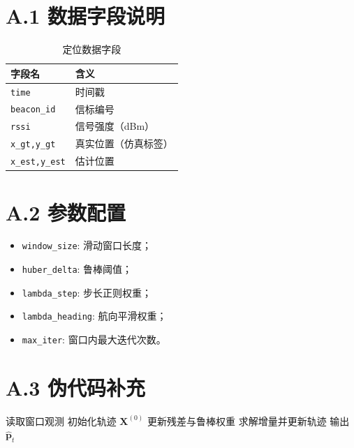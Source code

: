 \section*{A.1 数据字段说明}
\begin{table}[H]
\centering
\caption{定位数据字段}
\begin{tabular}{ll}
\toprule
字段名 & 含义 \\
\midrule
\texttt{time} & 时间戳 \\
\texttt{beacon\_id} & 信标编号 \\
\texttt{rssi} & 信号强度（dBm） \\
\texttt{x\_gt,y\_gt} & 真实位置（仿真标签） \\
\texttt{x\_est,y\_est} & 估计位置 \\
\bottomrule
\end{tabular}
\end{table}

\section*{A.2 参数配置}
\begin{itemize}
  \item \texttt{window\_size}: 滑动窗口长度；
  \item \texttt{huber\_delta}: 鲁棒阈值；
  \item \texttt{lambda\_step}: 步长正则权重；
  \item \texttt{lambda\_heading}: 航向平滑权重；
  \item \texttt{max\_iter}: 窗口内最大迭代次数。
\end{itemize}

\section*{A.3 伪代码补充}
\begin{algorithm}[H]
\caption{窗口定位主循环}
\begin{algorithmic}[1]
\State 读取窗口观测
\State 初始化轨迹 $\bm X^{(0)}$
\State 更新残差与鲁棒权重
\State 求解增量并更新轨迹
\EndFor
\State 输出 $\hat{\bm p}_t$
\EndFor
\end{algorithmic}
\end{algorithm}
